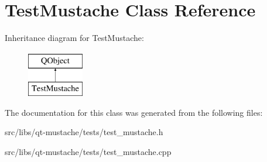 \hypertarget{classTestMustache}{\section{Test\+Mustache Class Reference}
\label{classTestMustache}
}
Inheritance diagram for Test\+Mustache\+:\begin{figure}[H]
\begin{center}
\leavevmode
\includegraphics[height=2.000000cm]{de/d63/classTestMustache}
\end{center}
\end{figure}


The documentation for this class was generated from the following files\+:\begin{DoxyCompactItemize}
\item 
src/libs/qt-\/mustache/tests/test\+\_\+mustache.\+h\item 
src/libs/qt-\/mustache/tests/test\+\_\+mustache.\+cpp\end{DoxyCompactItemize}
